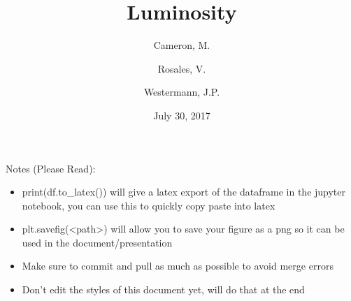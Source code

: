 \documentclass[12pt,fleqn,leqno,letterpaper]{article}
\title{Luminosity}
\author{Cameron, M. \and Rosales, V. \and Westermann, J.P.}
\date{July 30, 2017}
\begin{document}
\maketitle
\newpage
\tableofcontents
\listoffigures
\listoftables

\newpage

Notes (Please Read):
\begin{itemize}
  \item print(df.to\_latex()) will give a latex export of the dataframe in the jupyter notebook, you can use this to quickly copy paste into latex
  \item plt.savefig(<path>) will allow you to save your figure as a png so it can be used in the document/presentation
  \item Make sure to commit and pull as much as possible to avoid merge errors
  \item Don't edit the styles of this document yet, will do that at the end
\end{itemize}
\end{document}
